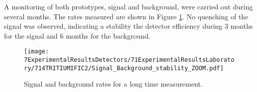 


A monitoring of both prototypes, signal and background, were carried out during several months. The rates measured are shown in Figure \ref{fig:MonitorizationTRITIUMIFIC2}. No quenching of the signal was observed, indicating a stability the detector efficiency during 3 months for the signal and 6 months for the background. %

\begin{figure}[h]
\centering
\texttt{[image: 7ExperimentalResultsDetectors/71ExperimentalResultsLaboratory/714TRITIUMIFIC2/Signal\_Background\_stability\_ZOOM.pdf]}
\caption{Signal and background rates for a long time measurement.\label{fig:MonitorizationTRITIUMIFIC2}}
\end{figure}









